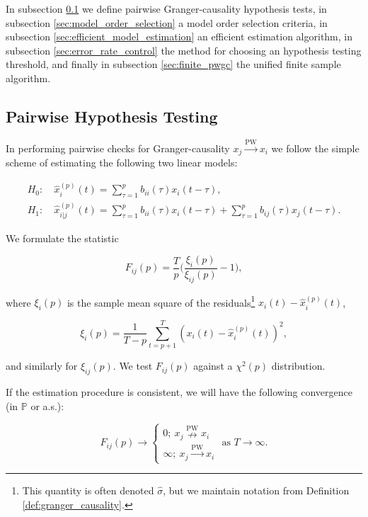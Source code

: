 \documentclass{statsoc}
\def\pwgc{\overset{\text{PW}}{\rightarrow}}  %
\def\npwgc{\overset{\text{PW}}{\nrightarrow}}  %
\def\P{\mathbb{P}}  %
\begin{document}
In subsection \ref{sec:pairwise_hypothesis_testing} we define pairwise
Granger-causality hypothesis tests, in subsection
\ref{sec:model_order_selection} a model order selection criteria, in
subsection \ref{sec:efficient_model_estimation} an efficient
estimation algorithm, in subsection \ref{sec:error_rate_control} the
method for choosing an hypothesis testing threshold, and finally in
subsection \ref{sec:finite_pwgc} the unified finite sample algorithm.

\subsection{Pairwise Hypothesis Testing}
\label{sec:pairwise_hypothesis_testing}
In performing pairwise checks for Granger-causality $x_j \pwgc x_i$ we
follow the simple scheme of estimating the following two linear models:

\begin{align}
  H_0:&\ \widehat{x}_i^{(p)}(t) = \sum_{\tau = 1}^{p} b_{ii}(\tau)x_i(t - \tau),\\
  H_1:&\ \widehat{x}_{i|j}^{(p)}(t) = \sum_{\tau = 1}^{p} b_{ii}(\tau)x_i(t - \tau) + \sum_{\tau = 1}^pb_{ij}(\tau)x_j(t - \tau).
\end{align}

We formulate the statistic 

\begin{equation}
  \label{eqn:gc_statistics}
  F_{ij}(p) = \frac{T}{p}\Big(\frac{\xi_i(p)}{\xi_{ij}(p)} - 1\Big),
\end{equation}

where $\xi_i(p)$ is the sample mean square of the
residuals\footnote{This quantity is often denoted $\widehat{\sigma}$,
  but we maintain notation from Definition
  \ref{def:granger_causality}.}  $x_i(t) - \widehat{x}^{(p)}_i(t)$,

\begin{equation*}
  \xi_i(p) = \frac{1}{T - p}\sum_{t = p + 1}^T (x_i(t) - \widehat{x}_i^{(p)}(t))^2,
\end{equation*}

and similarly for $\xi_{ij}(p)$.  We test $F_{ij}(p)$ against a
$\chi^2(p)$ distribution.

If the estimation procedure is consistent, we will have the following
convergence (in $\P$ or a.s.):

\begin{equation}
  F_{ij}(p) \rightarrow
  \left\{
    \begin{array}{ll}
      0;\ x_j \npwgc x_i\\
      \infty;\ x_j \pwgc x_i
    \end{array}
  \right. \text{ as } T \rightarrow \infty.  %
\end{equation}
\end{document}
